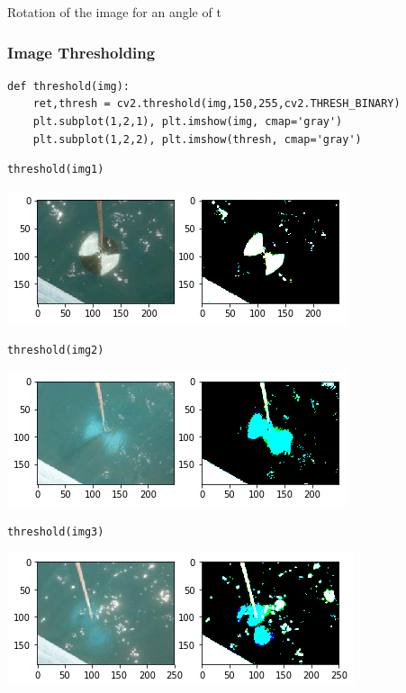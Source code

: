 Rotation of the image for an angle of t

\subsubsection{Image Thresholding}\label{image-thresholding}

\begin{verbatim}
def threshold(img):
    ret,thresh = cv2.threshold(img,150,255,cv2.THRESH_BINARY)
    plt.subplot(1,2,1), plt.imshow(img, cmap='gray')
    plt.subplot(1,2,2), plt.imshow(thresh, cmap='gray')
\end{verbatim}

\begin{verbatim}
threshold(img1)
\end{verbatim}

\includegraphics{secchi-a/output_13_0.png}


\begin{verbatim}
threshold(img2)
\end{verbatim}

\includegraphics{secchi-a/output_14_0.png}

\begin{verbatim}
threshold(img3)
\end{verbatim}

\includegraphics{secchi-a/output_15_0.png}

